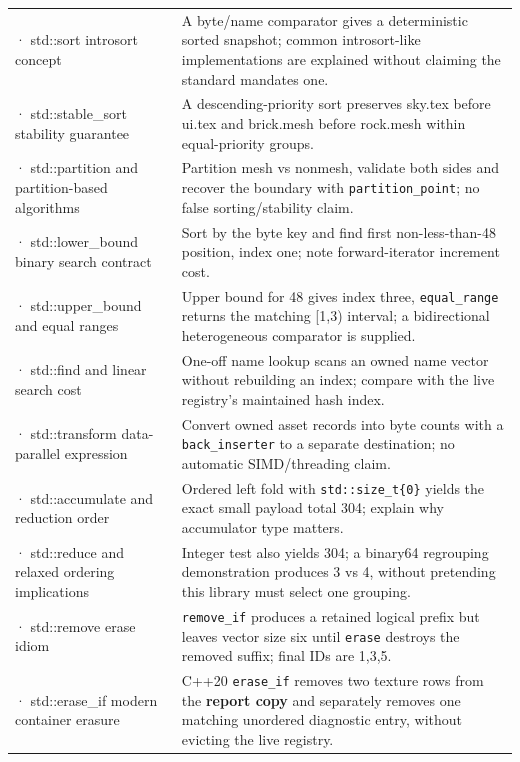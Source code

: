 {\begin{longtable}[]{@{}
  >{\raggedright\arraybackslash}p{}
  >{\raggedright\arraybackslash}p{}@{}}
260 · std::sort introsort concept & A byte/name comparator gives a deterministic sorted snapshot; common introsort-like implementations are explained without claiming the standard mandates one. \\
261 · std::stable\_sort stability guarantee & A descending-priority sort preserves sky.tex before ui.tex and brick.mesh before rock.mesh within equal-priority groups. \\
262 · std::partition and partition-based algorithms & Partition mesh vs nonmesh, validate both sides and recover the boundary with \texttt{partition\_point}; no false sorting/stability claim. \\
263 · std::lower\_bound binary search contract & Sort by the byte key and find first non-less-than-48 position, index one; note forward-iterator increment cost. \\
264 · std::upper\_bound and equal ranges & Upper bound for 48 gives index three, \texttt{equal\_range} returns the matching {[}1,3) interval; a bidirectional heterogeneous comparator is supplied. \\
265 · std::find and linear search cost & One-off name lookup scans an owned name vector without rebuilding an index; compare with the live registry's maintained hash index. \\
266 · std::transform data-parallel expression & Convert owned asset records into byte counts with a \texttt{back\_inserter} to a separate destination; no automatic SIMD/threading claim. \\
267 · std::accumulate and reduction order & Ordered left fold with \texttt{std::size\_t\{0\}} yields the exact small payload total 304; explain why accumulator type matters. \\
268 · std::reduce and relaxed ordering implications & Integer test also yields 304; a binary64 regrouping demonstration produces 3 vs 4, without pretending this library must select one grouping. \\
269 · std::remove erase idiom & \texttt{remove\_if} produces a retained logical prefix but leaves vector size six until \texttt{erase} destroys the removed suffix; final IDs are 1,3,5. \\
270 · std::erase\_if modern container erasure & C++20 \texttt{erase\_if} removes two texture rows from the \textbf{report copy} and separately removes one matching unordered diagnostic entry, without evicting the live registry. \\
\end{longtable}
}

